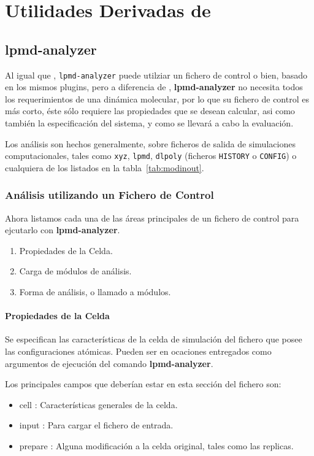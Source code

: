 \chapter{Utilidades Derivadas de \lpmd}
\label{chap:utilidades}
\section{lpmd-analyzer}

Al igual que {\lpmd}, \verb|lpmd-analyzer| puede utilziar un fichero de control o bien, basado en los mismos plugins, pero a diferencia de {\lpmd}, \textbf{lpmd-analyzer} no necesita todos los requerimientos de una din\'amica molecular, por lo que su fichero de control es m\'as corto, \'este s\'olo requiere las propiedades que se desean calcular, asi como tambi\'en la especificaci\'on del sistema, y como se llevar\'a a cabo la evaluaci\'on.

Los an\'alisis son hechos generalmente, sobre ficheros de salida de simulaciones computacionales, tales como \verb|xyz|, \verb|lpmd|, \verb|dlpoly| (ficheros \verb|HISTORY| o \verb|CONFIG|) o cualquiera de los listados en la tabla~\ref{tab:modinout}.

\subsection{An\'alisis utilizando un Fichero de Control}
Ahora listamos cada una de las \'areas principales de un fichero de control para ejcutarlo con \textbf{lpmd-analyzer}.

\begin{enumerate}
 \item Propiedades de la Celda.
 \item Carga de m\'odulos de an\'alisis.
 \item Forma de an\'alisis, o llamado a m\'odulos.
\end{enumerate}

\subsubsection{Propiedades de la Celda}
Se especifican las caracter\'isticas de la celda de simulaci\'on del fichero que posee las configuraciones at\'omicas. Pueden ser en ocaciones entregados como argumentos de ejecuci\'on del comando \textbf{lpmd-analyzer}.

Los principales campos que deber\'ian estar en esta secci\'on del fichero son:
\begin{itemize}
 \item cell : Caracter\'isticas generales de la celda.
 \item input : Para cargar el fichero de entrada.
 \item prepare : Alguna modificaci\'on a la celda original, tales como las replicas.
\end{itemize}
